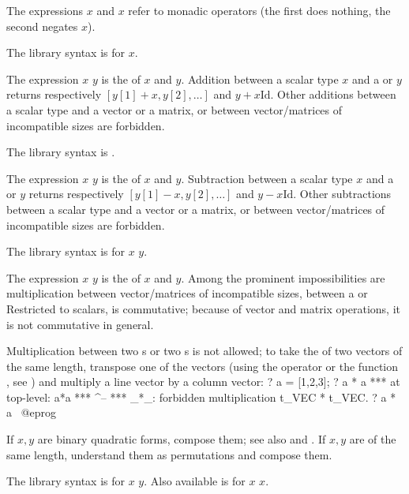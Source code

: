 \subseckbd{+$/$-} The expressions \kbd{+}$x$ and \kbd{-}$x$ refer
to monadic operators (the first does nothing, the second negates $x$).

The library syntax is  for \kbd{-}$x$.

\subseckbd{+} The expression $x$ \kbd{+} $y$ is the  of $x$ and $y$.
Addition between a scalar type $x$ and a  or  $y$ returns
respectively $[y[1] + x, y[2],\dots]$ and $y + x \text{Id}$. Other additions
between a scalar type and a vector or a matrix, or between vector/matrices of
incompatible sizes are forbidden.

The library syntax is .

\subseckbd{-} The expression $x$ \kbd{-} $y$ is the  of $x$
and $y$. Subtraction between a scalar type $x$ and a  or 
$y$ returns respectively $[y[1] - x, y[2],\dots]$ and $y - x \text{Id}$.
Other subtractions between a scalar type and a vector or a matrix, or
between vector/matrices of incompatible sizes are forbidden.

The library syntax is  for $x$ \kbd{-} $y$.

\subseckbd{*} The expression $x$ \kbd{*} $y$ is the  of $x$
and $y$. Among the prominent impossibilities are multiplication between
vector/matrices of incompatible sizes, between a  or 
Restricted to scalars, \kbd{*} is commutative; because of vector and matrix
operations, it is not commutative in general.

Multiplication between two s or two s is not
allowed; to take the  of two vectors of the same length,
transpose one of the vectors (using the operator \kbd{\til} or the function
, see ) and multiply a line vector
by a column vector:
\bprog
? a = [1,2,3];
? a * a
  ***   at top-level: a*a
  ***                  ^--
  *** _*_: forbidden multiplication t_VEC * t_VEC.
? a * a~
@eprog

If $x,y$ are binary quadratic forms, compose them; see also
 and . If $x,y$ are  of the same
length, understand them as permutations and compose them.

The library syntax is  for $x$ \kbd{*} $y$.
Also available is  for $x$ \kbd{*} $x$.

